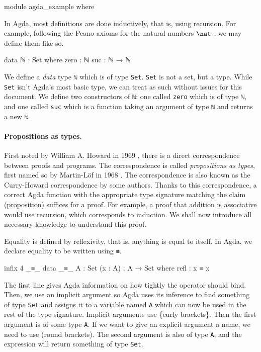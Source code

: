 \begin{code}
module agda_example where
\end{code}

In Agda, most definitions are done inductively, that is, using recursion. For example, following the
Peano axioms for the natural numbers $\nat$ \citep{boolos_freges_1995}, we may define them like so.
\begin{code}
  data ℕ : Set where
    zero : ℕ
    suc  : ℕ → ℕ
\end{code}
We define a \textit{data} type \texttt{ℕ} which is of type \texttt{Set}. \texttt{Set} is not a set,
but a type. While \texttt{Set} isn't Agda's most basic type, we can treat as such without issues for
this document. We define two constructors of \texttt{ℕ}: one called \texttt{zero} which is of type
\texttt{ℕ}, and one called \texttt{suc} which is a function taking an argument of type \texttt{ℕ}
and returns a new \texttt{ℕ}.

\paragraph*{Propositions as types.} First noted by William A. Howard in 1969
\citep{howard_formulae-as-types_1980}, there is a direct correspondence between proofs and programs.
The correspondence is called \textit{propositions as types}, first named so by Martin-Löf in 1968
\citep{wadler_propositions_2015}. The correspondence is also known as the Curry-Howard
correspondence by some authors. Thanks to this correspondence, a correct Agda function with the
appropriate type signature matching the claim (proposition) suffices for a proof. For example, a
proof that addition is associative would use recursion, which corresponds to induction. We shall now
introduce all necessary knowledge to understand this proof.

Equality is defined by reflexivity, that is, anything is equal to itself. In Agda, we declare
equality to be written using \texttt{≡}.
\begin{code}
  infix 4 _≡_
  data _≡_ {A : Set} (x : A) : A → Set where
    refl : x ≡ x
\end{code}
The first line gives Agda information on how tightly the operator should bind. Then, we use an
implicit argument so Agda uses its inference to find something of type \texttt{Set} and assigns it
to a variable named \texttt{A} which can now be used in the rest of the type signature. Implicit
arguments use \{curly brackets\}. Then the first argument is of some type \texttt{A}. If we want to
give an explicit argument a name, we need to use (round brackets). The second argument is also of
type \texttt{A}, and the expression will return something of type \texttt{Set}.

